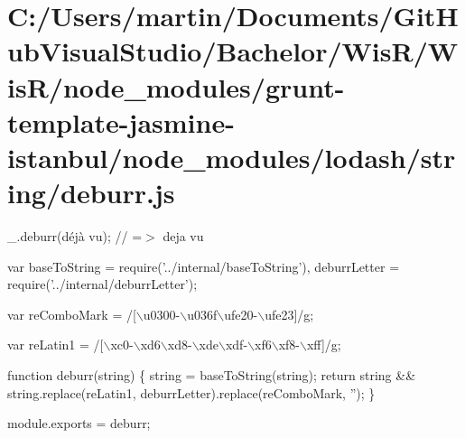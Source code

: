 \hypertarget{_c_1_2_users_2martin_2_documents_2_git_hub_visual_studio_2_bachelor_2_wis_r_2_wis_r_2node_module02d54d39578a75ca8775be0739d51acd}{}\section{C\+:/\+Users/martin/\+Documents/\+Git\+Hub\+Visual\+Studio/\+Bachelor/\+Wis\+R/\+Wis\+R/node\+\_\+modules/grunt-\/template-\/jasmine-\/istanbul/node\+\_\+modules/lodash/string/deburr.\+js}
\+\_\+.\+deburr(\textquotesingle{}déjà vu\textquotesingle{}); // =$>$ \textquotesingle{}deja vu\textquotesingle{}


\begin{DoxyCodeInclude}
var baseToString = require(\textcolor{stringliteral}{'../internal/baseToString'}),
    deburrLetter = require(\textcolor{stringliteral}{'../internal/deburrLetter'});

var reComboMark = /[\(\backslash\)u0300-\(\backslash\)u036f\(\backslash\)ufe20-\(\backslash\)ufe23]/g;

var reLatin1 = /[\(\backslash\)xc0-\(\backslash\)xd6\(\backslash\)xd8-\(\backslash\)xde\(\backslash\)xdf-\(\backslash\)xf6\(\backslash\)xf8-\(\backslash\)xff]/g;

\textcolor{keyword}{function} deburr(\textcolor{keywordtype}{string}) \{
  \textcolor{keywordtype}{string} = baseToString(\textcolor{keywordtype}{string});
  \textcolor{keywordflow}{return} \textcolor{keywordtype}{string} && \textcolor{keywordtype}{string}.replace(reLatin1, deburrLetter).replace(reComboMark, \textcolor{stringliteral}{''});
\}

module.exports = deburr;
\end{DoxyCodeInclude}
 